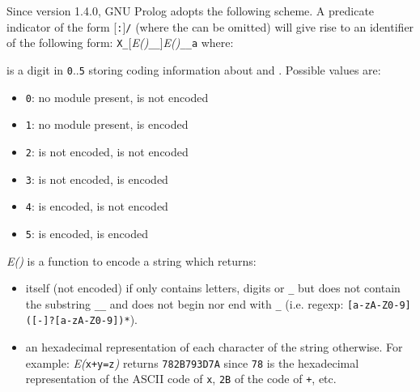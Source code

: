 Since version 1.4.0, GNU Prolog adopts the following 
scheme. A predicate indicator of the form
[\texttt{:}]\texttt{/} (where the
 can be omitted) will give rise to an identifier of the
following form:
\texttt{X}\texttt{\_}[\textit{E()}\texttt{\_\_}]\textit{E()}\texttt{\_\_a}
where:

\begin{description}

\item {} is a digit in \texttt{0}..\texttt{5} storing coding information
  about  and . Possible values are:

\begin{itemize}

  \item \texttt{0}: no module present,              is not encoded
  \item \texttt{1}: no module present,              is encoded
  \item \texttt{2}:  is not encoded,  is not encoded
  \item \texttt{3}:  is not encoded,  is encoded
  \item \texttt{4}:  is encoded,      is not encoded
  \item \texttt{5}:  is encoded,      is encoded

\end{itemize}

\item \textit{E()} is a function to encode a string  which returns:

\begin{itemize}

  \item {} itself (not encoded) if  only contains letters, digits or \texttt{\_} but does not contain the substring \texttt{\_\_} and does not begin nor end with \texttt{\_} (i.e. regexp: \texttt{[a-zA-Z0-9]([-]?[a-zA-Z0-9])*}).

\item an hexadecimal representation of each character of the string otherwise. For example: \textit{E(}\texttt{x+y=z}\textit{)} returns \texttt{782B793D7A} since
\texttt{78} is the hexadecimal representation of the ASCII code of \texttt{x},
\texttt{2B} of the code of \texttt{+}, etc.

\end{itemize}

\end{description}

